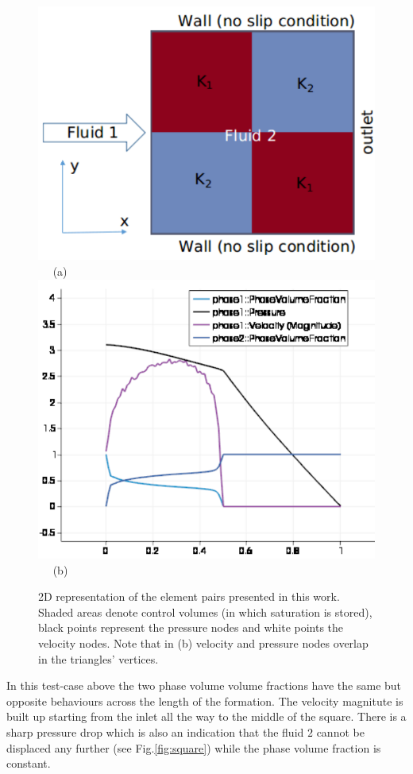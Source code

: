 \documentclass[preprint,authoryear,12pt]{elsarticle}
\begin{document}
\begin{figure}[h]
\vbox{
\hbox{\hspace{2.5cm}
\includegraphics[width=.6\textwidth]{./Pics/2b2_P1DGP2.pdf} 
}
\vspace{0.0cm}
\hbox{\hspace{5.0cm} (a)  
}
\vspace{0.5cm}
\hbox{\hspace{2.5cm}
\includegraphics[width=.6\textwidth]{./Pics/2b2_P1DGP2_plot.pdf}
}
\vspace{1.0cm}
\hbox{\hspace{5.0cm} (b)  
}}     
\caption{2D representation of the element pairs presented in this work. Shaded areas denote control volumes (in which saturation is stored), black points represent the pressure nodes and white points the velocity nodes. Note that in (b) velocity and pressure nodes overlap in the triangles' vertices.}
\label{fem_cv_represent_a}
\end{figure}

\noindent In this test-case above the two phase volume volume fractions have the same but opposite behaviours across the length of the formation. The velocity magnitute is built up starting from the inlet all the way to the middle of the square. There is a sharp pressure drop which is also an indication that the fluid $2$ cannot be displaced any further (see Fig.\ref{fig:square}) while the phase volume fraction is constant. 
\end{document}
